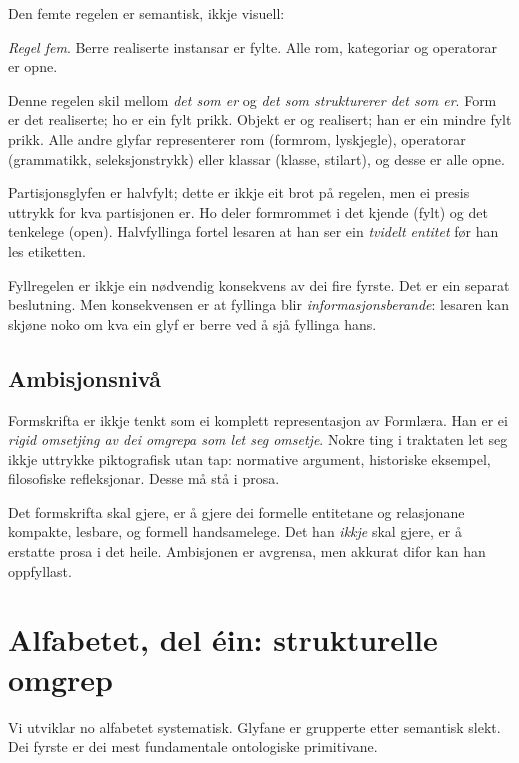 \documentclass[a4paper,11pt]{article}
\begin{document}
Den femte regelen er semantisk, ikkje visuell:

\begin{quoting}
\emph{Regel fem}. Berre realiserte instansar er fylte. Alle rom, kategoriar og operatorar er opne.
\end{quoting}

Denne regelen skil mellom \emph{det som er} og \emph{det som strukturerer det som er}. Form er det realiserte; ho er ein fylt prikk. Objekt er og realisert; han er ein mindre fylt prikk. Alle andre glyfar representerer rom (formrom, lyskjegle), operatorar (grammatikk, seleksjonstrykk) eller klassar (klasse, stilart), og desse er alle opne.

Partisjonsglyfen er halvfylt; dette er ikkje eit brot på regelen, men ei presis uttrykk for kva partisjonen er. Ho deler formrommet i det kjende (fylt) og det tenkelege (open). Halvfyllinga fortel lesaren at han ser ein \emph{tvidelt entitet} før han les etiketten.

Fyllregelen er ikkje ein nødvendig konsekvens av dei fire fyrste. Det er ein separat beslutning. Men konsekvensen er at fyllinga blir \emph{informasjonsberande}: lesaren kan skjøne noko om kva ein glyf er berre ved å sjå fyllinga hans.

\subsection{Ambisjonsnivå}

Formskrifta er ikkje tenkt som ei komplett representasjon av Formlæra. Han er ei \emph{rigid omsetjing av dei omgrepa som let seg omsetje}. Nokre ting i traktaten let seg ikkje uttrykke piktografisk utan tap: normative argument, historiske eksempel, filosofiske refleksjonar. Desse må stå i prosa.

Det formskrifta skal gjere, er å gjere dei formelle entitetane og relasjonane kompakte, lesbare, og formell handsamelege. Det han \emph{ikkje} skal gjere, er å erstatte prosa i det heile. Ambisjonen er avgrensa, men akkurat difor kan han oppfyllast.


\section{Alfabetet, del éin: strukturelle omgrep}

Vi utviklar no alfabetet systematisk. Glyfane er grupperte etter semantisk slekt. Dei fyrste er dei mest fundamentale ontologiske primitivane.
\end{document}
